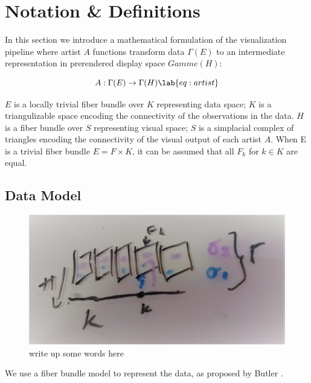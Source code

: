\documentclass[../main.tex]{subfiles}
\begin{document}
\section{Notation \& Definitions}
In this section we introduce a mathematical formulation of the visualization pipeline where artist $A$ functions transform data $\Gamma(E)$ to an intermediate representation in prerendered display space $Gamme(H)$:

\begin{equation}
    A: \Gamma(E) \rightarrow \Gamma(H)
    \lab{eq:artist}
\end{equation}

$E$ is a locally trivial fiber bundle over $K$ representing data space; $K$ is a triangulizable space encoding the connectivity of the observations in the data. $H$ is a fiber bundle over $S$ representing visual space;  $S$ is a simplacial complex of triangles encoding the connectivity of the visual output of each artist $A$. When E is a trivial fiber bundle $E = F \times K$, it can be assumed that all $F_{k}$ for $k \in K$ are equal. 

\begi

\subsection{Data Model}
\begin{figure}[ht]
    \label{fig:fiberbundle}
    \includegraphics{figures/sections/math/fiberbundle.png}
    \caption{write up some words here}

\end{figure}

We use a fiber bundle model to represent the data, as proposed by Butler 
\cite{butlerVectorBundleClassesForm1992,butlerVisualizationModelBased1989}. 
\end{document}
